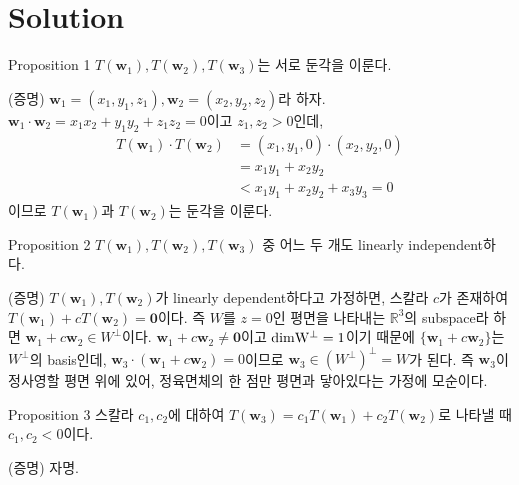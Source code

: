 \documentclass[11pt,t]{beamer}
\begin{document}
\section{Solution}
\begin{frame}
	\begin{block}{Proposition 1}
		$T(\mathbf{w}_1), T(\mathbf{w}_2), T(\mathbf{w}_3)$는 서로 둔각을 이룬다.
	\end{block}
(증명) $\mathbf{w}_1=(x_1, y_1, z_1), \mathbf{w}_2=(x_2, y_2, z_2)$라 하자. $\mathbf{w}_1 \cdot \mathbf{w}_2=x_1x_2 + y_1y_2 + z_1z_2=0$이고 $z_1, z_2>0$인데,
\begin{align*}
T(\mathbf{w}_1) \cdot T(\mathbf{w}_2)&=(x_1,y_1,0) \cdot (x_2,y_2,0) \\
&= x_1y_1+x_2y_2 \\
&< x_1y_1+x_2y_2+x_3y_3=0 
\end{align*}
이므로 $T(\mathbf{w}_1)$과 $T(\mathbf{w}_2)$는 둔각을 이룬다.
	
\end{frame}

\begin{frame}
	\begin{block}{Proposition 2}
		$T(\mathbf{w}_1), T(\mathbf{w}_2), T(\mathbf{w}_3)$ 중 어느 두 개도 linearly independent하다.
	\end{block}
(증명) $T(\mathbf{w}_1), T(\mathbf{w}_2)$가 linearly dependent하다고 가정하면, 스칼라 $c$가 존재하여 $T(\mathbf{w}_1)+ cT(\mathbf{w}_2)=\mathbf{0}$이다. 즉 $W$를 $z=0$인 평면을 나타내는 $\mathbb{R}^3$의 subspace라 하면 $\mathbf{w}_1+c\mathbf{w}_2 \in W^\perp$이다. $\mathbf{w}_1+c\mathbf{w}_2 \neq \mathbf{0}$이고 $\rm{dim} W^\perp=1$이기 때문에 $\{\mathbf{w}_1+c\mathbf{w}_2\}$는 $W^\perp$의 basis인데, $\mathbf{w}_3 \cdot (\mathbf{w}_1+c\mathbf{w}_2)=0$이므로 $\mathbf{w}_3 \in (W^\perp)^\perp=W$가 된다. 즉 $\mathbf{w}_3$이 정사영할 평면 위에 있어, 정육면체의 한 점만 평면과 닿아있다는 가정에 모순이다.
\end{frame}

\begin{frame}
	\begin{block}{Proposition 3}
		스칼라 $c_1,c_2$에 대하여 $T(\mathbf{w}_3)=c_1 T(\mathbf{w}_1) + c_2T(\mathbf{w}_2)$로 나타낼 때 $c_1,c_2<0$이다.
	\end{block}
(증명) 자명.
\end{frame}
\end{document}
